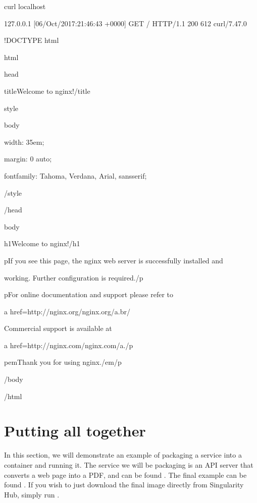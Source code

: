\documentclass[letterpaper,10pt,english]{sphinxmanual}
\begin{document}
%
\begin{sphinxVerbatim}[commandchars=\\\{\}]
\PYGZdl{} curl localhost

127.0.0.1 \PYGZhy{} \PYGZhy{} [06/Oct/2017:21:46:43 +0000] \PYGZdq{}GET / HTTP/1.1\PYGZdq{} 200 612 \PYGZdq{}\PYGZhy{}\PYGZdq{} \PYGZdq{}curl/7.47.0\PYGZdq{} \PYGZdq{}\PYGZhy{}\PYGZdq{}

\PYGZlt{}!DOCTYPE html\PYGZgt{}

\PYGZlt{}html\PYGZgt{}

\PYGZlt{}head\PYGZgt{}

\PYGZlt{}title\PYGZgt{}Welcome to nginx!\PYGZlt{}/title\PYGZgt{}

\PYGZlt{}style\PYGZgt{}

    body \PYGZob{}

        width: 35em;

        margin: 0 auto;

        font\PYGZhy{}family: Tahoma, Verdana, Arial, sans\PYGZhy{}serif;

    \PYGZcb{}

\PYGZlt{}/style\PYGZgt{}

\PYGZlt{}/head\PYGZgt{}

\PYGZlt{}body\PYGZgt{}

\PYGZlt{}h1\PYGZgt{}Welcome to nginx!\PYGZlt{}/h1\PYGZgt{}

\PYGZlt{}p\PYGZgt{}If you see this page, the nginx web server is successfully installed and

working. Further configuration is required.\PYGZlt{}/p\PYGZgt{}


\PYGZlt{}p\PYGZgt{}For online documentation and support please refer to

\PYGZlt{}a href=\PYGZdq{}http://nginx.org/\PYGZdq{}\PYGZgt{}nginx.org\PYGZlt{}/a\PYGZgt{}.\PYGZlt{}br/\PYGZgt{}

Commercial support is available at

\PYGZlt{}a href=\PYGZdq{}http://nginx.com/\PYGZdq{}\PYGZgt{}nginx.com\PYGZlt{}/a\PYGZgt{}.\PYGZlt{}/p\PYGZgt{}


\PYGZlt{}p\PYGZgt{}\PYGZlt{}em\PYGZgt{}Thank you for using nginx.\PYGZlt{}/em\PYGZgt{}\PYGZlt{}/p\PYGZgt{}

\PYGZlt{}/body\PYGZgt{}

\PYGZlt{}/html\PYGZgt{}
\end{sphinxVerbatim}


\section{Putting all together}
\label{\detokenize{running_services:putting-all-together}}
In this section, we will demonstrate an example of packaging a service
into a container and running it. The service we will be packaging is an
API server that converts a web page into a PDF, and can be found
. The final
example can be found .
If you wish to just download the final image directly from Singularity
Hub, simply run .
\end{document}
